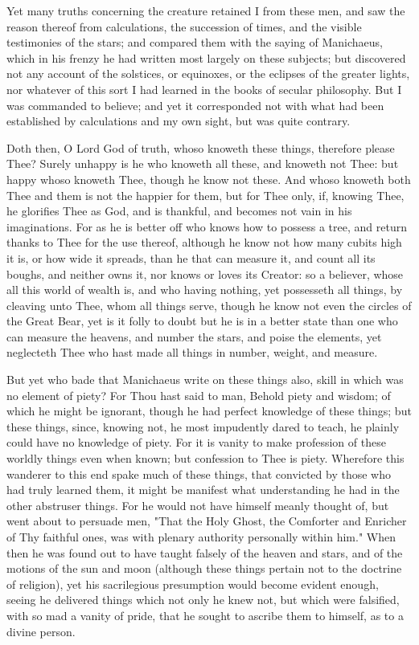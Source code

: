 \documentclass[b5paper,openright,12pt,twoside]{book}
\begin{document}
Yet many truths concerning the creature retained I from these men, and
saw the reason thereof from calculations, the succession of times, and
the visible testimonies of the stars; and compared them with the saying
of Manichaeus, which in his frenzy he had written most largely on these
subjects; but discovered not any account of the solstices, or equinoxes,
or the eclipses of the greater lights, nor whatever of this sort I
had learned in the books of secular philosophy. But I was commanded to
believe; and yet it corresponded not with what had been established by
calculations and my own sight, but was quite contrary.

Doth then, O Lord God of truth, whoso knoweth these things, therefore
please Thee? Surely unhappy is he who knoweth all these, and knoweth not
Thee: but happy whoso knoweth Thee, though he know not these. And whoso
knoweth both Thee and them is not the happier for them, but for Thee
only, if, knowing Thee, he glorifies Thee as God, and is thankful, and
becomes not vain in his imaginations. For as he is better off who knows
how to possess a tree, and return thanks to Thee for the use thereof,
although he know not how many cubits high it is, or how wide it spreads,
than he that can measure it, and count all its boughs, and neither owns
it, nor knows or loves its Creator: so a believer, whose all this world
of wealth is, and who having nothing, yet possesseth all things, by
cleaving unto Thee, whom all things serve, though he know not even
the circles of the Great Bear, yet is it folly to doubt but he is in a
better state than one who can measure the heavens, and number the stars,
and poise the elements, yet neglecteth Thee who hast made all things in
number, weight, and measure.

But yet who bade that Manichaeus write on these things also, skill in
which was no element of piety? For Thou hast said to man, Behold
piety and wisdom; of which he might be ignorant, though he had perfect
knowledge of these things; but these things, since, knowing not, he most
impudently dared to teach, he plainly could have no knowledge of piety.
For it is vanity to make profession of these worldly things even when
known; but confession to Thee is piety. Wherefore this wanderer to this
end spake much of these things, that convicted by those who had truly
learned them, it might be manifest what understanding he had in the
other abstruser things. For he would not have himself meanly thought of,
but went about to persuade men, "That the Holy Ghost, the Comforter and
Enricher of Thy faithful ones, was with plenary authority personally
within him." When then he was found out to have taught falsely of the
heaven and stars, and of the motions of the sun and moon (although these
things pertain not to the doctrine of religion), yet his sacrilegious
presumption would become evident enough, seeing he delivered things
which not only he knew not, but which were falsified, with so mad a
vanity of pride, that he sought to ascribe them to himself, as to a
divine person.
\end{document}
